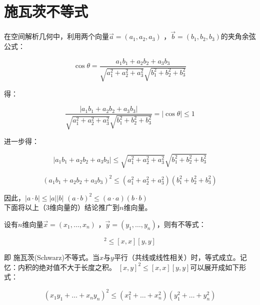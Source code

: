 \documentclass[UTF8]{ctexbook}
\begin{document}
\section{施瓦茨不等式}

在空间解析几何中，利用两个向量$\vec{a}=(a_{1},a_{2},a_{3})$ ，$\vec{b}=(b_{1},b_{2},b_{3})$的夹角余弦公式：

\begin{displaymath}
\cos \theta=\frac{a_{1}b_{1} + a_{2}b_{2} + a_{3}b_{3}}{\sqrt{a_{1}^{2}+a_ {2}^{2}+a_ {3}^{2}}\sqrt{b_{1}^{2}+b_ {2}^{2}+b_ {3}^{2}}}
\end{displaymath}

得：

\begin{displaymath}
\frac{|a_{1}b_{1} + a_{2}b_{2} + a_{3}b_{3}|}{\sqrt{a_{1}^{2}+a_ {2}^{2}+a_ {3}^{2}}\sqrt{b_{1}^{2}+b_ {2}^{2}+b_ {3}^{2}}}
=|\cos \theta| \leq 1
\end{displaymath}

进一步得：

\begin{displaymath}
|a_{1}b_{1} + a_{2}b_{2} + a_{3}b_{3}| \leq \sqrt{a_{1}^{2}+a_ {2}^{2}+a_ {3}^{2}}\sqrt{b_{1}^{2}+b_ {2}^{2}+b_ {3}^{2}}
\end{displaymath}

\begin{displaymath}
(a_{1}b_{1} + a_{2}b_{2} + a_{3}b_{3})^{2} \leq (a_{1}^{2}+a_ {2}^{2}+a_ {3}^{2})(b_{1}^{2}+b_ {2}^{2}+b_ {3}^{2})
\end{displaymath}

因此，$|a \cdot b| \leq |a||b|$ \quad $(a \cdot b)^{2} \leq (a \cdot a)(b \cdot b)$\\

下面将以上（3维向量的）结论推广到$n$维向量。

设有$n$维向量$\vec{x}=(x_{1},\dots,x_{n})$ ，$\vec{y}=(y_{1},\dots,y_{n})$，则有不等式：

\begin{displaymath}
[x,y]^{2} \leq [x,x][y,y]
\end{displaymath}

即 \quad 施瓦茨(Schwarz)不等式。当$x$与$y$平行（共线或线性相关）时，等式成立。记忆：内积的绝对值不大于长度之积。
$[x,y]^{2} \leq [x,x][y,y]$可以展开成如下形式：

\begin{displaymath}
(x_{1}y_{1}+\dots+x_{n}y_{n})^{2} \leq
(x_{1}^{2}+\dots+x_{n}^{2})(y_{1}^{2}+\dots+y_{n}^{2})
\end{displaymath}
\end{document}
